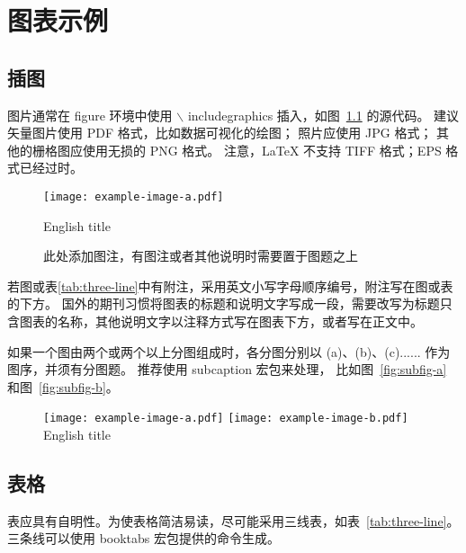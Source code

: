 
\chapter{图表示例}

\section{插图}

图片通常在 figure 环境中使用\cite{dupont1974bone}\cite{jianduju1994}  $\backslash$ includegraphics 插入，如图~\ref{fig:example} 的源代码。
建议矢量图片使用 PDF 格式，比如数据可视化的绘图；
照片应使用 JPG 格式；
其他的栅格图应使用无损的 PNG 格式。
注意，LaTeX 不支持 TIFF 格式；EPS 格式已经过时。

\begin{figure}[h]
	\centering
	\texttt{[image: example-image-a.pdf]}
	\caption*{此处添加图注，有图注或者其他说明时需要置于图题之上}
	 {English title}

	\label{fig:example}
\end{figure}

若图或表\ref{tab:three-line}中有附注，采用英文小写字母顺序编号，附注写在图或表的下方。
国外的期刊习惯将图表的标题和说明文字写成一段，需要改写为标题只含图表的名称，其他说明文字以注释方式写在图表下方，或者写在正文中。

如果一个图由两个或两个以上分图组成时，各分图分别以 (a)、(b)、(c)...... 作为图序，并须有分图题。
推荐使用 subcaption 宏包来处理， 比如图~\ref{fig:subfig-a} 和图~\ref{fig:subfig-b}。



\begin{figure}[h]
	\centering
	{\texttt{[image: example-image-a.pdf]}}
	{\texttt{[image: example-image-b.pdf]}}
	 {English title}

	\label{fig:multi-image}
\end{figure}



\section{表格}

表应具有自明性。为使表格简洁易读，尽可能采用三线表，如表~\ref{tab:three-line}。
三条线可以使用 booktabs 宏包提供的命令生成。

